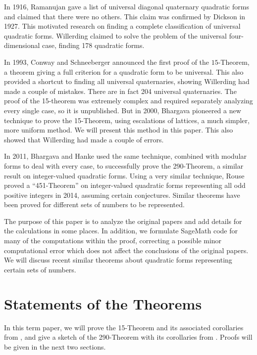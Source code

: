 \documentclass[letterpaper, 12pt]{article}
\begin{document}
In 1916, Ramanujan \cite{ramanujan1916diagonal} gave a list of universal diagonal quaternary quadratic forms and claimed that there were no others. This claim was confirmed by Dickson \cite{Dickson1927} in 1927. This motivated research on finding a complete classification of universal quadratic forms.
Willerding \cite{willerding1947} claimed to solve the problem of the universal four-dimensional case, finding 178 quadratic forms.

In 1993, Conway and Schneeberger announced the first proof of the $15$-Theorem, a theorem giving a full criterion for a quadratic form to be universal. This also provided a shortcut to finding all universal quaternaries, showing Willerding had made a couple of mistakes. There are in fact 204 universal quaternaries.
The proof of the 15-theorem was extremely complex and required separately analyzing every single case, so it is unpublished.
But in 2000, Bhargava \cite{fifteen} pioneered a new technique to prove the 15-Theorem, using escalations of lattices, a much simpler, more uniform method.  We will present this method in this paper. This also showed that Willerding had made a couple of errors.

In 2011, Bhargava and Hanke \cite{twoninety} used the same technique, combined with modular forms to deal with every case, to successfully prove the 290-Theorem, a similar result on integer-valued quadratic forms.
Using a very similar technique, Rouse proved a ``451-Theorem'' \cite{451} on integer-valued quadratic forms representing all odd positive integers in 2014, assuming certain conjectures. Similar theorems have been proved for different sets of numbers to be represented.

The purpose of this paper is to analyze the original papers and add details for the calculations in some places. In addition, we formulate SageMath code for many of the computations within the proof, correcting a possible minor computational error which does not affect the conclusions of the original papers. We will discuss recent similar theorems about quadratic forms representing certain sets of numbers.

\section{Statements of the Theorems}
In this term paper, we will prove the 15-Theorem and its associated corollaries from \cite{fifteen}, and give a sketch of the 290-Theorem with its corollaries from \cite{twoninety}. Proofs will be given in the next two sections.
\end{document}
